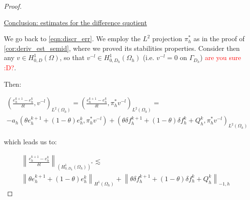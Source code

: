 \documentclass[english,a4paper,9pt,oneside]{scrbook}	%
\theoremstyle{break}
\newenvironment{mproof}[1][\proofname]{%
  \begin{proof}[#1]$ $\par\nobreak\ignorespaces
}{%
  \end{proof}
}
\renewcommand*{\proofname}{Proof}
\theoremstyle{remark}
\newcommand{\norm}[1]{\left\lVert#1\right\rVert}
\begin{document}
\begin{appendices}
\begin{mproof}
%
%
%
%
%
%
%

\underline{Conclusion: estimates for the difference quotient}

We go back to \cref{eqn:discr_err}.  We employ the $L^2$ projection $\pi_h^*$ as in the proof of \cref{cor:deriv_est_semid}, where we proved its stabilities properties. Consider then any $v \in H^1_{0,D}(\Omega)$, so that $v^{-l} \in H^1_{0,D_h}(\Omega_h)$ (i.e. $v^{-l}=0$ on $\Gamma_{D_h}$) \textcolor{red}{are you sure :D?}.

Then:

\begin{align}
\label{eqn:der_err_eqn}
\left ( \frac{e_{h}^{k+1}-e_h^k}{\delta t}, v^{-l}\right)_{L^2(\Omega_h)} = \left ( \frac{e_{h}^{k+1}-e_h^k}{\delta t}, \pi_h^* v^{-l}\right)_{L^2(\Omega_h)} =  \\- a_h(\theta e_h^{k+1}+(1-\theta)e^k_h, \pi_h^* v^{-l}) + (\theta \delta f_h^{k+1}+(1-\theta)\delta f_h^k + Q_h^k, \pi_h^* v^{-l})_{L^2(\Omega_h)}
\end{align}

which leads us to:

\begin{align*}
\norm{ \frac{e_{h}^{k+1}-e_h^k}{\delta t}}_{(H^1_{0,D_h}(\Omega_h))^*} \lesssim  \\\norm{\theta e_h^{k+1}+(1-\theta)e^k_h}_{H^1(\Omega_h)} + \norm{\theta \delta f_h^{k+1}+(1-\theta)\delta f_h^k + Q_h^k}_{-1,h}
\end{align*}


\end{mproof}
\end{appendices}
\end{document}
